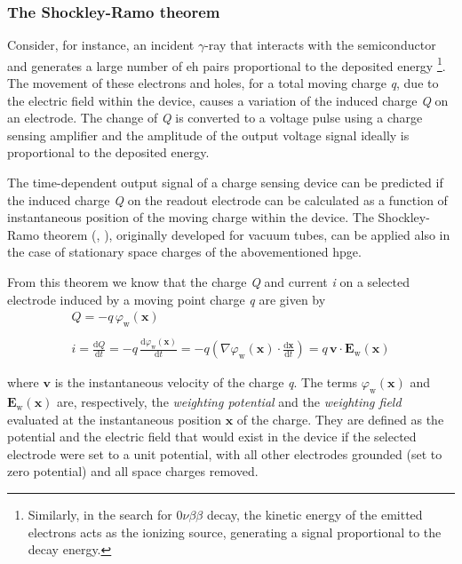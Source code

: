 \subsubsection{The Shockley-Ramo theorem}
Consider, for instance, an incident $\gamma$-ray that interacts with the semiconductor and generates a large number of \ac{eh} pairs proportional to the deposited energy \footnote{Similarly, in the search for $0\nu\beta\beta$ decay, the kinetic energy of the emitted electrons acts as the ionizing source, generating a signal proportional to the decay energy.}. The movement of these electrons and holes, for a total moving charge \textit{q}, due to the electric field within the device, causes a variation of the induced charge \textit{Q} on an electrode. The change of \textit{Q} is converted to a voltage pulse using a charge sensing amplifier and the amplitude of the output voltage signal ideally is proportional to the deposited energy.

The time-dependent output signal of a charge sensing device can be predicted if the induced charge \textit{Q} on the readout electrode can be calculated as a function of instantaneous position of the moving charge  within the device. The Shockley-Ramo theorem (\cite{Shockley}, \cite{Ramo}), originally developed for vacuum tubes, can be applied also in the case of stationary space charges of the abovementioned \ac{hpge}. 

From this theorem we know that the charge \textit{Q} and current \textit{i} on a selected electrode induced by a moving point charge \textit{q} are given by
\begin{equation}
    \label{eq:carica-corrente-SR}
    \begin{gathered}
        Q = - q \, \varphi_\text{w} (\mathbf{x}) \\~\\
        i = \frac{\text{d}Q}{\text{d}t} = -q \, \frac{\text{d}\varphi_\text{w} (\mathbf{x})}{\text{d}t} = -q \left( \nabla \varphi_\text{w}(\mathbf{x}) \cdot \frac{\text{d}\mathbf{x}}{\text{d}t} \right) = q \, \mathbf{v} \cdot \mathbf{E}_\text{w}(\mathbf{x})
    \end{gathered}
\end{equation}

where $\mathbf{v}$ is the instantaneous velocity of the charge \textit{q}. The terms $\varphi_\text{w}(\mathbf{x})$ and $\mathbf{E}_\text{w}(\mathbf{x})$ are, respectively, the \textit{weighting potential} and the \textit{weighting field} evaluated at the instantaneous position $\mathbf{x}$ of the charge. They are defined as the potential and the electric field that would exist in the device if the selected electrode were set to a unit potential, with all other electrodes grounded (set to zero potential) and all space charges removed. \cite{GeDetectors}


